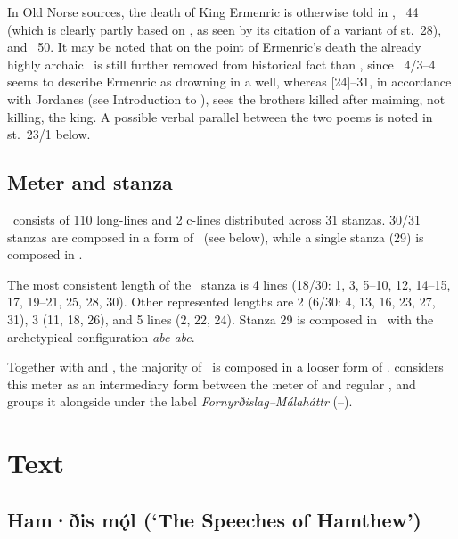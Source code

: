 In Old Norse sources, the death of King Ermenric is otherwise told in \Ragnarsdrapa, \VolsungaSaga\ 44 (which is clearly partly based on , as seen by its citation of a variant of st.~28), and \Skaldskaparmal\ 50.
It may be noted that on the point of Ermenric’s death the already highly archaic \Ragnarsdrapa\ is still further removed from historical fact than \Hamdismal, since \Ragnarsdrapa\ 4/3--4 seems to describe Ermenric as drowning in a well, whereas [24]--31, in accordance with Jordanes (see Introduction to ), sees the brothers killed after maiming, not killing, the king.  A possible verbal parallel between the two poems is noted in st.~23/1 below.

\subsection{Meter and stanza}

\Hamdismal\ consists of 110 long-lines and 2 c-lines distributed across 31 stanzas.  30/31 stanzas are composed in a form of \Fornyrdislag\ (see below), while a single stanza (29) is composed in \Ljodahattr.

The most consistent length of the \Fornyrdislag\ stanza is 4 lines (18/30: 1, 3, 5--10, 12, 14--15, 17, 19--21, 25, 28, 30).  Other represented lengths are 2 (6/30: 4, 13, 16, 23, 27, 31), 3 (11, 18, 26), and 5 lines (2, 22, 24).
Stanza 29 is composed in \Ljodahattr\ with the archetypical configuration \emph{abc abc}.

Together with  and , the majority of \Hamdismal\ is composed in a looser form of \Fornyrdislag.  \textcite[525--539]{Suzuki2014} considers this meter as an intermediary form between the meter of  and regular \Fornyrdislag, and groups it alongside  under the label \emph{Fornyrðislag--Málaháttr} (\Fornyrdislag--\Malahattr).

\sectionline

\newpage

\section{Text}

\subsection{Ham·ðis mǫ́l (‘The Speeches of Hamthew’)}

